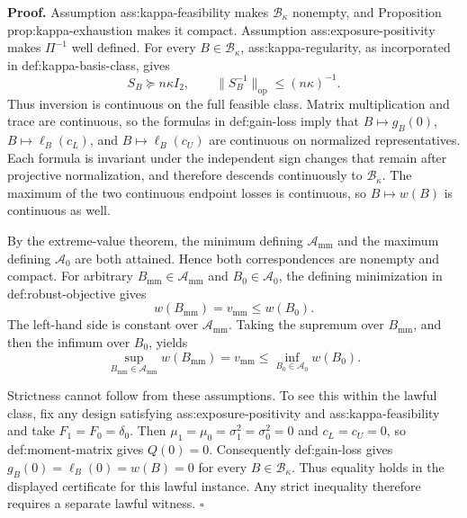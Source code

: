 \textbf{Proof.}
Assumption ass:kappa-feasibility makes \(\mathcal B_\kappa\) nonempty, and Proposition prop:kappa-exhaustion makes it compact.  Assumption ass:exposure-positivity makes \(\Pi^{-1}\) well defined.  For every \(B\in\mathcal B_\kappa\), ass:kappa-regularity, as incorporated in def:kappa-basis-class, gives
\[
S_B\succeq n\kappa I_2,
\qquad
\lVert S_B^{-1}\rVert_{\mathrm{op}}\le (n\kappa)^{-1}.
\]
Thus inversion is continuous on the full feasible class.  Matrix multiplication and trace are continuous, so the formulas in def:gain-loss imply that \(B\mapsto g_B(0)\), \(B\mapsto\ell_B(c_L)\), and \(B\mapsto\ell_B(c_U)\) are continuous on normalized representatives.  Each formula is invariant under the independent sign changes that remain after projective normalization, and therefore descends continuously to \(\mathcal B_\kappa\).  The maximum of the two continuous endpoint losses is continuous, so \(B\mapsto w(B)\) is continuous as well.

By the extreme-value theorem, the minimum defining \(\mathcal A_{\mathrm{mm}}\) and the maximum defining \(\mathcal A_0\) are both attained.  Hence both correspondences are nonempty and compact.  For arbitrary \(B_{\mathrm{mm}}\in\mathcal A_{\mathrm{mm}}\) and \(B_0\in\mathcal A_0\), the defining minimization in def:robust-objective gives
\[
w(B_{\mathrm{mm}})=v_{\mathrm{mm}}\le w(B_0).
\]
The left-hand side is constant over \(\mathcal A_{\mathrm{mm}}\).  Taking the supremum over \(B_{\mathrm{mm}}\), and then the infimum over \(B_0\), yields
\[
\sup_{B_{\mathrm{mm}}\in\mathcal A_{\mathrm{mm}}}w(B_{\mathrm{mm}})
=v_{\mathrm{mm}}
\le
\inf_{B_0\in\mathcal A_0}w(B_0).
\]

Strictness cannot follow from these assumptions.  To see this within the lawful class, fix any design satisfying ass:exposure-positivity and ass:kappa-feasibility and take \(F_1=F_0=\delta_0\).  Then \(\mu_1=\mu_0=\sigma_1^2=\sigma_0^2=0\) and \(c_L=c_U=0\), so def:moment-matrix gives \(Q(0)=0\).  Consequently def:gain-loss gives \(g_B(0)=\ell_B(0)=w(B)=0\) for every \(B\in\mathcal B_\kappa\).  Thus equality holds in the displayed certificate for this lawful instance.  Any strict inequality therefore requires a separate lawful witness. \(\square\)